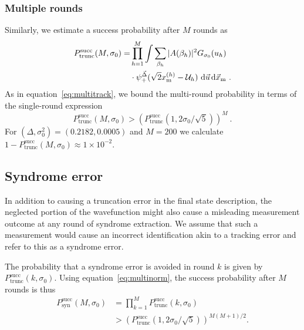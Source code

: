 \documentclass[prx,reprint,superscriptaddress,longbibliography,floatfix,nofootinbib]{revtex4-1}
\begin{document}
\subsubsection{Multiple rounds}
Similarly, we estimate a success probability after $M$ rounds as
\begin{equation}
\begin{split}
    P^{\text{succ}}_{\text{trunc}}(M,\sigma_0)  = & \prod_{h=1}^{M}\int \sum_{\beta_h} |A(\beta_h)|^2 
    G_{\sigma_0}(u_h) \hspace{0.05cm} 
    \\ & \cdot \psi^{\vec{\Delta}}_{+}(\sqrt{2}x^{(h)}_{\text{m}}-\mathcal{U}_h) \ \text{d}\vec{u} \hspace{0.05cm} \text{d}\vec{x}_\text{m} \ .
\end{split}
\end{equation}
As in equation~\ref{eq:multitrack}, we bound the multi-round probability in terms of the single-round expression
\begin{equation}
\label{eq:multinorm}
P^{\text{succ}}_{\text{trunc}}(M,\sigma_0) > (P^{\text{succ}}_{\text{trunc}}(1,2\sigma_0/\sqrt{5}))^M \ .
\end{equation}
For $(\Delta,\sigma_0^2) = (0.2182,0.0005)$ and $M=200$ we calculate $1-P^{\text{succ}}_{\text{trunc}}(M,\sigma_0) \approx 1\times10^{-2}$.
\iffalse
\subsection{Syndrome error}
In addition to causing a truncation error in the final state description, the neglected portion of the wavefunction might also cause a misleading measurement outcome at any round of syndrome extraction. We assume that such a measurement would cause an incorrect identification akin to a tracking error and refer to this as a syndrome error. 

The probability that a syndrome error is avoided in round $k$ is given by $P^{\text{succ}}_{\text{trunc}}(k,\sigma_0)$. Using equation~\ref{eq:multinorm}, the success probability after $M$ rounds is thus
\begin{equation}
\begin{split}
P^{\text{succ}}_{\text{syn}}(M,\sigma_0) &= \prod_{k=1}^M P^{\text{succ}}_{\text{trunc}}(k,\sigma_0)\\ 
&>
(P^{\text{succ}}_{\text{trunc}}(1,2\sigma_0/\sqrt{5}))^{M(M+1)/2}.
\end{split}
\end{equation}
\end{document}
